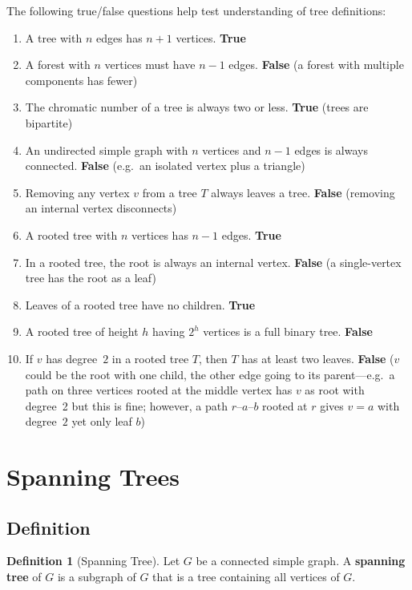 \documentclass[11pt, a4paper, notitlepage]{report}
\theoremstyle{definition}
\newtheorem{definition}[theorem]{Definition}
\theoremstyle{remark}
\begin{document}
The following true/false questions help test understanding of tree definitions:
\begin{enumerate}[label=(\alph*)]
  \item A tree with $n$ edges has $n + 1$ vertices. \hfill \textbf{True}
  \item A forest with $n$ vertices must have $n - 1$ edges. \hfill \textbf{False} (a forest with multiple components has fewer)
  \item The chromatic number of a tree is always two or less. \hfill \textbf{True} (trees are bipartite)
  \item An undirected simple graph with $n$ vertices and $n - 1$ edges is always connected. \hfill \textbf{False} (e.g.\ an isolated vertex plus a triangle)
  \item Removing any vertex $v$ from a tree $T$ always leaves a tree. \hfill \textbf{False} (removing an internal vertex disconnects)
  \item A rooted tree with $n$ vertices has $n - 1$ edges. \hfill \textbf{True}
  \item In a rooted tree, the root is always an internal vertex. \hfill \textbf{False} (a single-vertex tree has the root as a leaf)
  \item Leaves of a rooted tree have no children. \hfill \textbf{True}
  \item A rooted tree of height $h$ having $2^h$ vertices is a full binary tree. \hfill \textbf{False}
  \item If $v$ has degree~$2$ in a rooted tree $T$, then $T$ has at least two leaves. \hfill \textbf{False} ($v$ could be the root with one child, the other edge going to its parent---e.g.\ a path on three vertices rooted at the middle vertex has $v$ as root with degree~2 but this is fine; however, a path $r$--$a$--$b$ rooted at $r$ gives $v = a$ with degree~$2$ yet only leaf $b$)
\end{enumerate}

\section{Spanning Trees}
\label{sec:spanning-trees}

\subsection{Definition}
\label{subsec:spanning-tree-def}

\begin{definition}[Spanning Tree]
\label{def:spanning-tree}
Let $G$ be a connected simple graph. A \textbf{spanning tree} of $G$ is a subgraph of $G$ that is a tree containing all vertices of $G$.
\end{definition}
\end{document}
